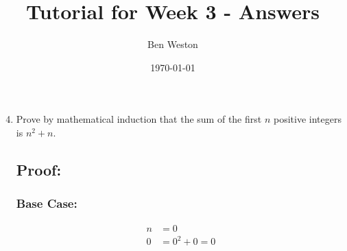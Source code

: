 \documentclass{article}
\title{Tutorial for Week 3 - Answers}
\author{Ben Weston}
\date{\today}
\begin{document}
\maketitle
\begin{enumerate}\setcounter{enumi}{3}
        \item{Prove by mathematical induction that the sum of the first $n$ positive integers is $n^2+n$.

                        \subsection*{Proof:}
                        \subsubsection*{Base Case:}
                        \begin{equation}
                                \begin{split}
                                        n &=0\\
                                        0 &=0^2+0=0
                                \end{split}
                        \end{equation}
}
\end{enumerate}
\end{document}
